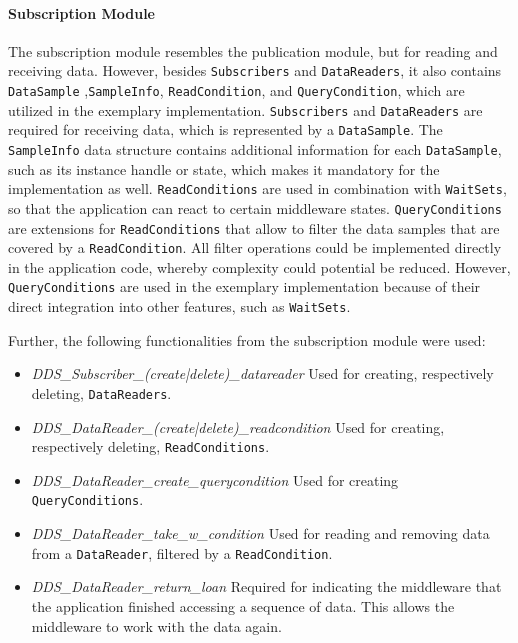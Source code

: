 \paragraph{Subscription Module}
The subscription module resembles the publication module, but for reading and receiving data.
However, besides \texttt{Subscribers} and \texttt{DataReaders}, it also contains \texttt{DataSample} ,\texttt{SampleInfo}, \texttt{ReadCondition}, and \texttt{QueryCondition}, which are utilized in the exemplary implementation.
\texttt{Subscribers} and \texttt{DataReaders} are required for receiving data, which is represented by a \texttt{DataSample}.
The \texttt{SampleInfo} data structure contains additional information for each \texttt{DataSample}, such as its instance handle or state, which makes it mandatory for the implementation as well.
\texttt{ReadConditions} are used in combination with \texttt{WaitSets}, so that the application can react to certain middleware states.
\texttt{QueryConditions} are extensions for \texttt{ReadConditions} that allow to filter the data samples that are covered by a \texttt{ReadCondition}.
All filter operations could be implemented directly in the application code, whereby complexity could potential be reduced.
However, \texttt{QueryConditions} are used in the exemplary implementation because of their direct integration into other  features, such as \texttt{WaitSets}.

Further, the following functionalities from the subscription module were used:

\begin{itemize}
\item \textit{DDS\_Subscriber\_(create|delete)\_datareader} Used for creating, respectively deleting, \texttt{DataReaders}.
\item \textit{DDS\_DataReader\_(create|delete)\_readcondition} Used for creating, respectively deleting, \texttt{ReadConditions}.
\item \textit{DDS\_DataReader\_create\_querycondition} Used for creating \texttt{QueryConditions}.
\item \textit{DDS\_DataReader\_take\_w\_condition} Used for reading and removing data from a \texttt{DataReader}, filtered by a \texttt{ReadCondition}.
\item \textit{DDS\_DataReader\_return\_loan} Required for indicating the middleware that the application finished accessing a sequence of data. This allows the middleware to work with the data again.
\end{itemize}

